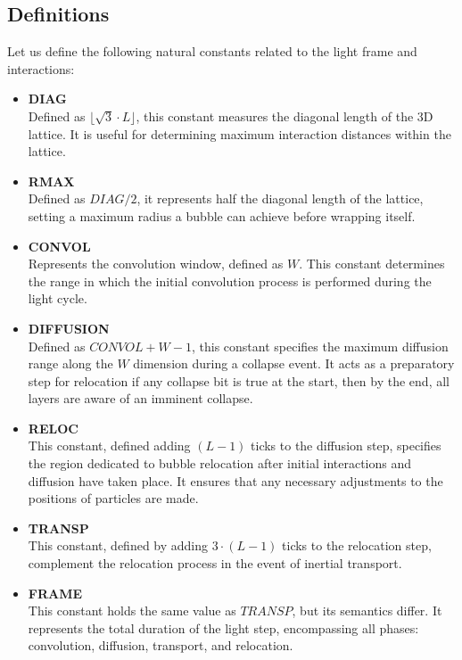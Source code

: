 \documentclass[12pt,english]{article}
\begin{document}
\subsection{Definitions\label{subsec:Definitions}}

Let us define the following natural constants related to the light frame and interactions:

\begin{itemize}
\item \textbf{DIAG}\\
Defined as $ \lfloor \sqrt{3} \cdot L \rfloor$, this constant measures the diagonal length of the 3D lattice. It is useful for determining maximum interaction distances within the lattice.

\item \textbf{RMAX}\\
Defined as $DIAG/2$, it represents half the diagonal length of the lattice, setting a maximum radius a bubble can achieve before wrapping itself.

\item \textbf{CONVOL}\\
Represents the convolution window, defined as $W$. This constant determines the range in which the initial convolution process is performed during the light cycle.

\item \textbf{DIFFUSION} \\
Defined as \(CONVOL + W - 1\), this constant specifies the maximum diffusion range along the \(W\) dimension during a collapse event. It acts as a preparatory step for relocation if any collapse bit is true at the start, then by the end, all layers are aware of an imminent collapse.

\item \textbf{RELOC}\\
This constant, defined adding $(L-1)$ ticks to the diffusion step, specifies the region dedicated to bubble relocation after initial interactions and diffusion have taken place. It ensures that any necessary adjustments to the positions of particles are made.

\item \textbf{TRANSP} \\  
This constant, defined by adding \(3\cdot (L-1)\) ticks to the relocation step, complement the relocation process in the event of inertial transport.

\item \textbf{FRAME}\\
This constant holds the same value as $TRANSP$, but its semantics differ. It represents the total duration of the light step, encompassing all phases: convolution, diffusion, transport, and relocation.

\end{itemize}
\end{document}
